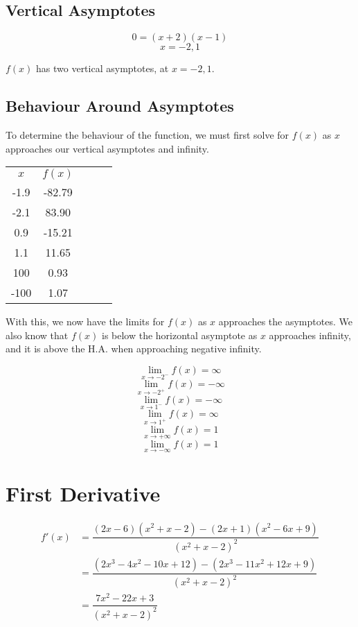 \documentclass[12pt]{article}
\begin{document}
\subsection*{Vertical Asymptotes}

{\bfseries \[0 = (x+2)(x-1)\] \n \[x = -2, 1\]}

$f(x)$ has two vertical asymptotes, at $x = -2, 1$.

\subsection*{Behaviour Around Asymptotes}

To determine the behaviour of the function, we must first solve for $f(x)$ as $x$ approaches our vertical asymptotes and infinity.

\begin{table}[h]
\centering
\begin{tabular}{|c|c|lll}
\cline{1-2}
$x$    & $f(x)$   &  &  &  \\ \cline{1-2}
-1.9 & -82.79 &  &  &  \\ \cline{1-2}
-2.1 & 83.90  &  &  &  \\ \cline{1-2}
0.9  & -15.21 &  &  &  \\ \cline{1-2}
1.1  & 11.65  &  &  &  \\ \cline{1-2}
100  & 0.93   &  &  &  \\ \cline{1-2}
-100 & 1.07   &  &  &  \\ \cline{1-2}
\end{tabular}
\label{tab:my-table}
\end{table}

With this, we now have the limits for $f(x)$ as $x$ approaches the asymptotes. We also know that $f(x)$ is below the horizontal asymptote as $x$ approaches infinity, and it is above the H.A. when approaching negative infinity.

\[\lim_{x \to -2^-} f(x) = \infty\] 
\[\lim_{x \to -2^+} f(x) = -\infty\]
\[\lim_{x \to 1^-} f(x) = -\infty\]
\[\lim_{x \to 1^+} f(x) = \infty\]
\[\lim_{x \to +\infty} f(x) = 1\]
\[\lim_{x \to -\infty} f(x) = 1\]

\section*{First Derivative}

\begin{align*}
f'(x) & = \dfrac{(2x-6)(x^2+x-2)-(2x+1)(x^2-6x+9)}{(x^2+x-2)^2}
\\&= \dfrac{(2x^3-4x^2-10x+12) - (2x^3-11x^2+12x+9)}{(x^2+x-2)^2}
\\&= \dfrac{7x^2-22x+3}{(x^2+x-2)^2}
\end{align*}
\end{document}
